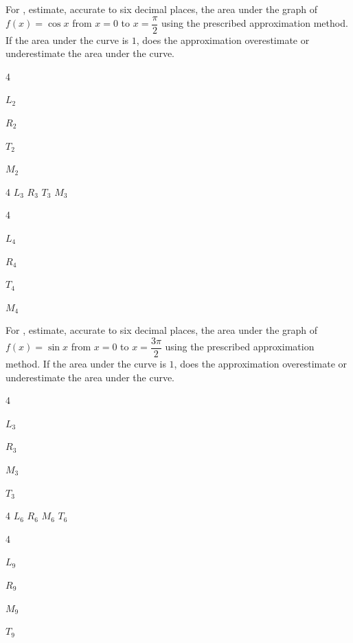 \documentclass{book}
\begin{document}
For , estimate, accurate to six decimal places, the area under the graph of $f(x)=\cos x$ from $x=0$ to $x=\dfrac{\pi}{2}$ using the prescribed approximation method. If the area under the curve is $1$, does the approximation overestimate or underestimate the area under the curve.
\begin{enumerate}[!HW!]
\begin{multicols}{4}
\item\label{exer:areaestimatecosine:start} $L_2$ 
\item $R_2$ 
\item $T_2$ 
\item $M_2$ 
\end{multicols}
\begin{multicols}{4}
\itemspade $L_3$ 
\itemspade $R_3$ 
\itemspade $T_3$ 
\itemspade $M_3$
\end{multicols}
\begin{multicols}{4}
\item $L_4$ 
\item $R_4$ 
\item $T_4$ 
\item\label{exer:areaestimatecosine:stop} $M_4$ 
\end{multicols}
\end{enumerate}

For , estimate, accurate to six decimal places, the area under the graph of $f(x)=\sin x$ from $x=0$ to $x=\dfrac{3\pi}{2}$ using the prescribed approximation method. If the area under the curve is $1$, does the approximation overestimate or underestimate the area under the curve.
\begin{enumerate}[!HW!]
\begin{multicols}{4}
\item\label{exer:areaestimatesine:start} $L_3$ 
\item $R_3$  
\item $M_3$ 
\item $T_3$ 
\end{multicols}
\begin{multicols}{4}
\itemspade $L_6$ 
\itemspade $R_6$ 
\itemspade $M_6$ 
\itemspade $T_6$ 
\end{multicols}
\begin{multicols}{4}
\item $L_9$ 
\item $R_9$ 
\item $M_9$ 
\item\label{exer:areaestimatesine:stop} $T_9$
\end{multicols}
\end{enumerate}
\end{document}
